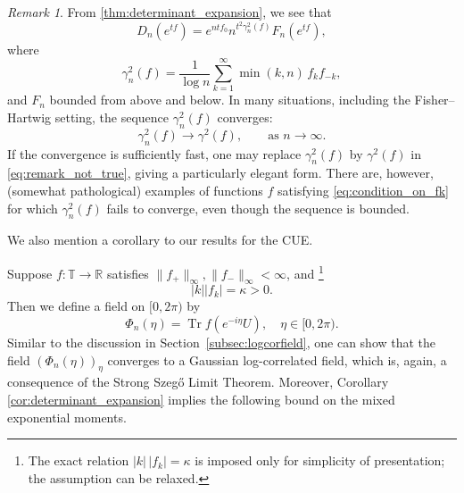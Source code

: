 \documentclass[11pt]{amsart}
\theoremstyle{plain}
\theoremstyle{remark}
\newtheorem{remark}[theorem]{Remark}
\DeclareMathOperator{\Tr}{Tr}
\numberwithin{equation}{section}
\begin{document}
\begin{remark} 
From \eqref{thm:determinant_expansion}, we see that
\begin{equation}\label{eq:remark_not_true}
D_n(e^{tf})
=
e^{n t f_0} n^{t^2\gamma_n^2(f)} F_n(e^{tf}),
\end{equation}
where
\[
\gamma_n^2(f)
=
\frac{1}{\log n}
\sum_{k=1}^{\infty} \min(k,n)\, f_k f_{-k},
\]
and $F_n$ bounded from above and below.
In many situations, including the Fisher--Hartwig setting, the sequence
$\gamma_n^2(f)$ converges:
\[
\gamma_n^2(f)\to \gamma^2(f),
\qquad\text{as } n\to\infty.
\]
If the convergence is sufficiently fast, one may replace
$\gamma_n^2(f)$ by $\gamma^2(f)$ in \eqref{eq:remark_not_true}, giving a particularly elegant form. There are, however, (somewhat pathological) examples of functions $f$ satisfying
\eqref{eq:condition_on_fk} for which $\gamma_n^2(f)$ fails to
converge, even though the sequence is bounded. 
\end{remark}
We also mention a corollary to our results for the CUE. 

Suppose $f:\mathbb{T}\rightarrow\mathbb{R}$ satisfies $\|f_+\|_{\infty}, \|f_-\|_{\infty}< \infty$, and \footnote{The exact relation \(|k|\,|f_k|=\kappa\) is imposed only for
simplicity of presentation; the assumption can be relaxed.} 
    $$
   |k| |f_k| =\kappa>0. 
    $$
Then we define a field on $[0,2\pi)$ by 
\begin{equation}\label{eq:field_def}
\Phi_n(\eta)=\Tr f(e^{-{i \eta}}U), \quad \eta \in [0,2 \pi).
\end{equation}
Similar to the discussion in Section~\ref{subsec:logcorfield}, one can show that the field $(\Phi_n(\eta))_\eta$ converges to a Gaussian log-correlated field, which is, again, a consequence of the Strong Szeg\H{o} Limit Theorem. Moreover,  Corollary \ref{cor:determinant_expansion} implies the following bound on the mixed exponential moments. 
\end{document}
